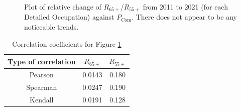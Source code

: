 \documentclass[11pt]{article}
\begin{document}
\begin{figure}[!htb]
	\centering
	\hfill
	\hfill
	\caption{Plot of relative change of $R_{65+}$/$R_{55+}$ from 2011 to 2021 (for each Detailed Occupation) against $P_{\text{Com}}$. There does not appear to be any noticeable trends.}
	\label{fig:Relative change against PCom}
\end{figure}


\begin{table}[]
\centering
\begin{tabular}{@{}ccc@{}}
\toprule
\textbf{Type of correlation} & \textbf{$R_{65+}$} & \textbf{$R_{55+}$} \\ \midrule
Pearson                      & 0.0143    & 0.180     \\
Spearman                     & 0.0247     & 0.190     \\
Kendall                      & 0.0191    & 0.128    \\ \bottomrule
\end{tabular}
\caption{Correlation coefficients for Figure \ref{fig:Relative change against PCom}}
\label{tab:correlation for relative}
\end{table}
\end{document}
